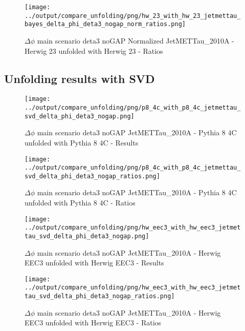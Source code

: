 \documentclass[11pt]{book}
\begin{document}
\begin{figure}[ht]
\centering
\texttt{[image: ../output/compare\_unfolding/png/hw\_23\_with\_hw\_23\_jetmettau\_bayes\_delta\_phi\_deta3\_nogap\_norm\_ratios.png]}
\caption{$\Delta\phi$ main scenario deta3 noGAP Normalized JetMETTau\_2010A - Herwig 23 unfolded with Herwig 23 - Ratios}
\label{hw_23_hw_23_jetmettau_bayes_delta_phi_deta3_nogap_norm_b}
\end{figure}


\clearpage
\subsection{Unfolding results with SVD}

\begin{figure}[ht]
\centering
\texttt{[image: ../output/compare\_unfolding/png/p8\_4c\_with\_p8\_4c\_jetmettau\_svd\_delta\_phi\_deta3\_nogap.png]}
\caption{$\Delta\phi$ main scenario deta3 noGAP JetMETTau\_2010A - Pythia 8 4C unfolded with Pythia 8 4C - Results}
\label{p8_p8_jetmettau_svd_delta_phi_deta3_nogap_a}
\end{figure}

\begin{figure}[ht]
\centering
\texttt{[image: ../output/compare\_unfolding/png/p8\_4c\_with\_p8\_4c\_jetmettau\_svd\_delta\_phi\_deta3\_nogap\_ratios.png]}
\caption{$\Delta\phi$ main scenario deta3 noGAP JetMETTau\_2010A - Pythia 8 4C unfolded with Pythia 8 4C - Ratios}
\label{p8_p8_jetmettau_svd_delta_phi_deta3_nogap_b}
\end{figure}

\begin{figure}[ht]
\centering
\texttt{[image: ../output/compare\_unfolding/png/hw\_eec3\_with\_hw\_eec3\_jetmettau\_svd\_delta\_phi\_deta3\_nogap.png]}
\caption{$\Delta\phi$ main scenario deta3 noGAP JetMETTau\_2010A - Herwig EEC3 unfolded with Herwig EEC3 - Results}
\label{hw_eec3_hw_eec3_jetmettau_svd_delta_phi_deta3_nogap_a}
\end{figure}

\begin{figure}[ht]
\centering
\texttt{[image: ../output/compare\_unfolding/png/hw\_eec3\_with\_hw\_eec3\_jetmettau\_svd\_delta\_phi\_deta3\_nogap\_ratios.png]}
\caption{$\Delta\phi$ main scenario deta3 noGAP JetMETTau\_2010A - Herwig EEC3 unfolded with Herwig EEC3 - Ratios}
\label{hw_eec3_hw_eec3_jetmettau_svd_delta_phi_deta3_nogap_b}
\end{figure}
\end{document}
